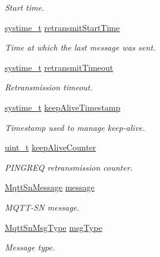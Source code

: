\begin{DoxyCompactItemize}
\begin{DoxyCompactList}\small\item\em Start time. \end{DoxyCompactList}\item 
\hyperlink{compiler__port_8h_ae3e32a98d431a02106616da3071832dd}{systime\+\_\+t} \hyperlink{struct__MqttSnClientContext_aa83c09d8530417289e0ff810ed7b4ed4}{retransmit\+Start\+Time}
\begin{DoxyCompactList}\small\item\em Time at which the last message was sent. \end{DoxyCompactList}\item 
\hyperlink{compiler__port_8h_ae3e32a98d431a02106616da3071832dd}{systime\+\_\+t} \hyperlink{struct__MqttSnClientContext_ae0413ca5fe25d8af672d6c9054c63ba5}{retransmit\+Timeout}
\begin{DoxyCompactList}\small\item\em Retransmission timeout. \end{DoxyCompactList}\item 
\hyperlink{compiler__port_8h_ae3e32a98d431a02106616da3071832dd}{systime\+\_\+t} \hyperlink{struct__MqttSnClientContext_a73e5a2ca2b8df9086fe4e0be2f1ce8a4}{keep\+Alive\+Timestamp}
\begin{DoxyCompactList}\small\item\em Timestamp used to manage keep-\/alive. \end{DoxyCompactList}\item 
\hyperlink{compiler__port_8h_a12a1e9b3ce141648783a82445d02b58d}{uint\+\_\+t} \hyperlink{struct__MqttSnClientContext_a5006ddd5c6848b1e295f1c2e8162673d}{keep\+Alive\+Counter}
\begin{DoxyCompactList}\small\item\em P\+I\+N\+G\+R\+EQ retransmission counter. \end{DoxyCompactList}\item 
\hyperlink{structMqttSnMessage}{Mqtt\+Sn\+Message} \hyperlink{struct__MqttSnClientContext_ac46ef511cd60fd0f70caf1c5c0357c90}{message}
\begin{DoxyCompactList}\small\item\em M\+Q\+T\+T-\/\+SN message. \end{DoxyCompactList}\item 
\hyperlink{mqtt__sn__common_8h_a0b5ccdae8aa73dc7c74ae2dfe62fd112}{Mqtt\+Sn\+Msg\+Type} \hyperlink{struct__MqttSnClientContext_ac1323adf09e5971bb667b08a80378334}{msg\+Type}
\begin{DoxyCompactList}\small\item\em Message type. \end{DoxyCompactList}\item 

\end{DoxyCompactItemize}
